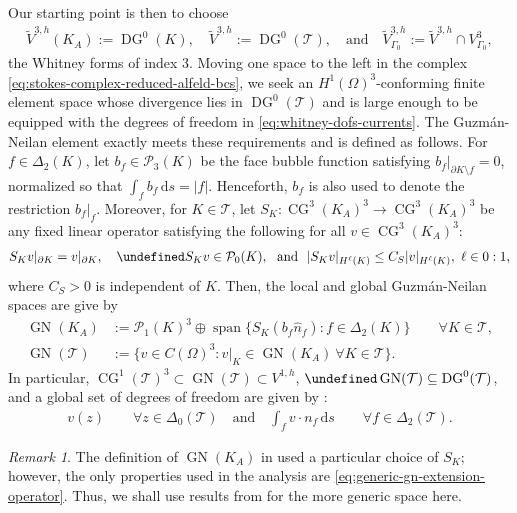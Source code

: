\documentclass{mcom-l}
\theoremstyle{definition}
\theoremstyle{remark}
\newtheorem{remark}[theorem]{Remark}
\numberwithin{equation}{section}
\newcommand{\unitvec}[1]{\hat{#1}}
\renewcommand{\d}[1]{\,\mathrm{d}{#1}}
\let\div\undefined
\DeclareMathOperator{\GN}{GN}
\DeclareMathOperator{\CG}{CG}
\DeclareMathOperator{\DG}{DG}
\DeclareMathOperator{\div}{div}
\DeclareMathOperator{\spann}{span}
\newcommand{\mesh}[0]{\mathcal{T}}
\begin{document}
Our starting point is then to choose 
\begin{align}
	\label{eq:min-l2-space}
	\tilde{V}^{3, h}(K_A) := \DG^0(K), \quad  
	\tilde{V}^{3, h} := \DG^0(\mesh), \quad \text{and} \quad 
	\tilde{V}^{3, h}_{\Gamma_0} := \tilde{V}^{3, h} \cap V^3_{\Gamma_0},
\end{align}
the Whitney forms of index 3.
Moving one space to the left in the complex 
\cref{eq:stokes-complex-reduced-alfeld-bcs},
we seek an $H^1(\Omega)^3$-conforming finite element space whose divergence 
lies in $\DG^0(\mesh)$ and is large enough to be equipped 
with the degrees of freedom in \cref{eq:whitney-dofs-currents}.
The Guzm\'{a}n-Neilan element \cite[Section 4]{GuzmanNeilan18} exactly 
meets these requirements and is defined as follows. For $f \in \Delta_2(K)$, 
let $b_f \in \mathcal{P}_3(K)$ be the face bubble function satisfying 
$b_f|_{\partial K \setminus f} = 0$, normalized so that 
$\int_f b_f \d{s} = |f|$. Henceforth, $b_f$ is also used to denote the 
restriction $b_f|_f$. Moreover, for $K \in \mesh$, let 
$S_{K} : \CG^{3}(K_A)^3 \to \CG^{3}(K_A)^3$ 
be any fixed linear operator satisfying the following
for all $v \in \CG^{3}(K_A)^3$:
\begin{align}
	\label{eq:generic-gn-extension-operator}
	S_{K} v|_{\partial K} 
	= v|_{\partial K}, 
	\quad 
	\div S_{K} v \in \mathcal{P}_0(K),  
	\ \ \text{and} \ \
	| S_K v |_{H^{\ell}(K)} 
	\leq C_{S} |v |_{H^{\ell}(K)}, \ \ell \in 0:1,
\end{align}
where $C_{S} > 0$ is independent of $K$. Then, the local and global 
Guzm\'{a}n-Neilan spaces are give by
\begin{align}
	\label{eq:gn-local}
	\GN(K_A) &:= \mathcal{P}_1(K)^3 
	\oplus 
	\spann\{ S_{K}( b_f \unitvec{n}_f) : f \in \Delta_2(K)  \}
	\qquad \forall K \in \mesh, \\
	\label{gn:global}
	\GN(\mesh) &:= \{v \in C(\Omega)^3 : 
	v|_{K} \in \GN(K_A) \ \forall K \in \mesh  \}.
\end{align}
In particular, $\CG^1(\mesh)^3 \subset \GN(\mesh) \subset V^{1, h}$,
$\div \GN(\mesh) \subseteq \DG^0(\mesh)$, and a global set of 
degrees of freedom are given by \cite[Lemma 4.3]{GuzmanNeilan18}: 
\begin{align}
	\label{eq:gn-dofs}
	v(z) \qquad \forall z \in \Delta_0(\mesh) 
	\quad \text{and} \quad
	\int_f v \cdot n_f \d{s} \qquad \forall f \in \Delta_2(\mesh).
\end{align}

\begin{remark}
	The definition of $\GN(K_A)$ in \cite[Section 4]{GuzmanNeilan18} used a 
	particular choice of $S_K$; however, the only properties used in the 
	analysis are \cref{eq:generic-gn-extension-operator}. Thus, we
	shall use results from \cite{GuzmanNeilan18} for the more generic space 
	here.
\end{remark}
\end{document}
